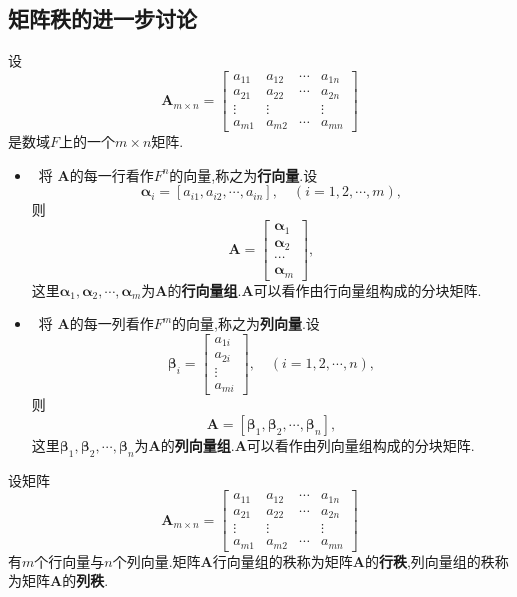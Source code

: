 \documentclass[9pt,a4paper]{book}
\begin{document}
\subsection{矩阵秩的进一步讨论}
\begin{defination}
	设\[ \bm{A}_{m\times n}=\left[ {\begin{array}{*{20}{c}}
		{{a_{11}}}&{{a_{12}}}& \cdots &{{a_{1n}}}\\
		{{a_{21}}}&{{a_{22}}}& \cdots &{{a_{2n}}}\\
		\vdots   &{ \vdots} &{}      & \vdots \\
		{{a_{m1}}}&{{a_{m2}}}& \cdots &{{a_{mn}}}
		\end{array}} \right] \]是数域$ F $上的一个$ m\times n $矩阵.
	\begin{itemize}
		\item[\color{HotPink1} \textleaf ] {\color{HotPink1}}\ 将 $ \bm{A} $的每一行看作$ F^n $的向量,称之为\textbf{行向量}.设\[ \bm{\alpha}_i=[a_{i1},a_{i2},\cdots,a_{in}],\quad (i=1,2,\cdots,m), \]则\[ \bm{A}=\begin{bmatrix}
		\bm{\alpha}_1\\\bm{\alpha}_2\\\cdots\\\bm{\alpha}_m
		\end{bmatrix} ,\]这里$ \bm{\alpha}_1,\bm{\alpha}_2,\cdots,\bm{\alpha}_m $为$ \bm{A} $的\textbf{行向量组}.$ \bm{A} $可以看作由行向量组构成的分块矩阵.
		\item[\color{HotPink1} \textleaf ] {\color{HotPink1}}\ 将 $ \bm{A} $的每一列看作$ F^m $的向量,称之为\textbf{列向量}.设\[ \bm{\beta}_i=\begin{bmatrix}
		a_{1i}\\a_{2i}\\\vdots\\a_{mi}
		\end{bmatrix},\quad (i=1,2,\cdots,n), \]则\[ \bm{A}=[\bm{\beta}_1,\bm{\beta}_2,\cdots,\bm{\beta}_n] ,\]这里$\bm{\beta}_1,\bm{\beta}_2,\cdots,\bm{\beta}_n$为$ \bm{A} $的\textbf{列向量组}.$ \bm{A} $可以看作由列向量组构成的分块矩阵.
	\end{itemize}
\end{defination}
\begin{defination}[行秩与列秩的定义]
	设矩阵\[ \bm{A}_{m\times n}=\left[ {\begin{array}{*{20}{c}}
		{{a_{11}}}&{{a_{12}}}& \cdots &{{a_{1n}}}\\
		{{a_{21}}}&{{a_{22}}}& \cdots &{{a_{2n}}}\\
		\vdots   &{ \vdots} &{}      & \vdots \\
		{{a_{m1}}}&{{a_{m2}}}& \cdots &{{a_{mn}}}
		\end{array}} \right] \]有$ m $个行向量与$ n $个列向量.矩阵$ \bm{A} $行向量组的秩称为矩阵$ \bm{A} $的\textbf{行秩},列向量组的秩称为矩阵$ \bm{A} $的\textbf{列秩}.
\end{defination}
\end{document}
